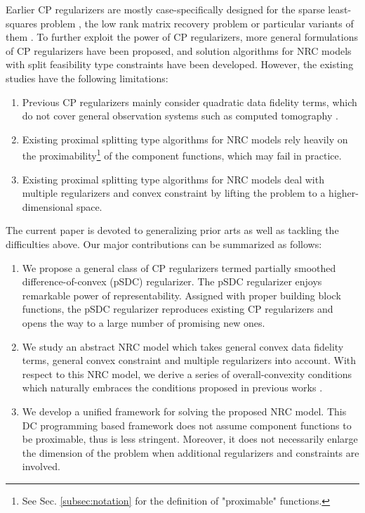 \documentclass[lettersize,journal]{IEEEtran}
\theoremstyle{plain}%
\theoremstyle{definition}
\theoremstyle{remark}
\begin{document}
Earlier CP regularizers are mostly case-specifically designed for the sparse least-squares problem \cite{selesnick2017}, the low rank matrix recovery problem \cite{parekh2016} or particular variants of them \cite{selesnick2020,suzuki2021}. To further exploit the power of CP regularizers, more general formulations of CP regularizers \cite{abe2020,alshabili2021} have been proposed, and solution algorithms \cite{yata2021} for NRC models with split feasibility type constraints \cite{censor2005} have been developed. However, the existing studies have the following limitations:
\begin{enumerate}
\item Previous CP regularizers \cite{selesnick2017,abe2020,alshabili2021} mainly consider quadratic data fidelity terms, which do not cover general observation systems such as computed tomography \cite{bouman1996}.

\item Existing proximal splitting type algorithms  \cite{selesnick2017,abe2020,alshabili2021,yata2021} for NRC models rely heavily on the proximability\footnote{See Sec. \ref{subsec:notation} for the definition of "proximable" functions.} of the component functions, which may fail in practice.

\item Existing proximal splitting type algorithms \cite{selesnick2017,abe2020,alshabili2021,yata2021} for NRC models deal with multiple regularizers \cite[Example 3]{abe2020} and convex constraint \cite{yata2021} by lifting the problem to a higher-dimensional space.
\end{enumerate}

The current paper is devoted to generalizing prior arts as well as tackling the difficulties above. Our major contributions can be summarized as follows:
\begin{enumerate}
\item We propose a general class of CP regularizers termed partially smoothed difference-of-convex (pSDC) regularizer. The pSDC regularizer enjoys remarkable power of representability.  Assigned with proper building block functions, the pSDC regularizer reproduces existing CP regularizers \cite{selesnick2017,abe2020,alshabili2021} and opens the way to a large number of promising new ones. 

\item We study an abstract NRC model which takes general convex data fidelity terms, general convex constraint and multiple regularizers into account. With respect to this NRC model, we derive a series of overall-convexity conditions which naturally embraces the conditions proposed in previous works \cite{parekh2016,selesnick2017,abe2020,alshabili2021,suzuki2021}.

\item We develop a unified framework for solving the proposed NRC model. This DC programming \cite{le2018} based framework does not assume component functions to be proximable, thus is less stringent. Moreover, it does not necessarily enlarge the dimension of the problem when additional regularizers and constraints are involved.
\end{enumerate}
\end{document}
